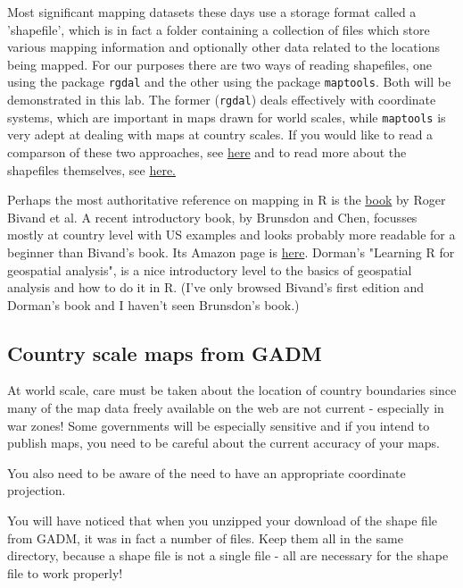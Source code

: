 \documentclass[titlepage]{book}\usepackage{knitr}
\begin{document}
Most significant mapping datasets these days use a storage format called a 'shapefile', which is in fact a folder containing a collection of files which store various mapping information and optionally other data related to the locations being mapped. For our purposes there are two ways of reading shapefiles, one using the package \texttt{rgdal} and the other using the package \texttt{maptools}.  Both will be demonstrated in this lab. The former (\texttt{rgdal}) deals effectively with coordinate systems, which are important in maps drawn for world scales, while \texttt{maptools} is very adept at dealing with maps at country scales. If you would like to read a comparson of these two approaches, see \href{https://www.nceas.ucsb.edu/scicomp/usecases/ReadWriteESRIShapeFiles}{here} and to read more about the shapefiles themselves, see \href{http://www.digitalpreservation.gov/formats/fdd/fdd000280.shtml}{ here.}

Perhaps the most authoritative reference on mapping in R is the \href{http://www.asdar-book.org/}{book} by Roger Bivand et al. A recent introductory book, by Brunsdon and Chen,  focusses mostly at country level with US examples and looks probably more readable for a beginner than Bivand's book.  Its Amazon page is \href{http://www.amazon.com/dp/1446272958/ref=rdr_ext_tmb}{here}. Dorman's "Learning R for geospatial analysis", is a nice introductory level to the basics of geospatial analysis and how to do it in R. (I've only browsed Bivand's first edition and Dorman's book and I haven't seen Brunsdon's book.)

\subsection{Country scale maps from GADM}
At world scale, care must be taken about the location of country boundaries since many of the map data freely available on the web are not current - especially in war zones!  Some governments will be especially sensitive and if you intend to publish maps, you need to be  careful about the current accuracy of your maps.

You also need to be aware of the need to have an appropriate coordinate projection.

You will have noticed that when you unzipped your download of the shape file from GADM, it was in fact a number of files. Keep them all in the same directory, because a shape file is not a single file - all are necessary for the shape file to work properly! 
\end{document}
